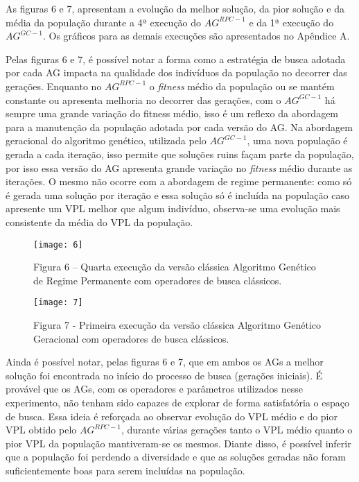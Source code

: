As figuras 6 e 7, apresentam a evolução da melhor solução, da pior solução e da média da população durante a 4ª execução do $AG^{RPC-1}$ e da 1ª execução do $AG^{GC-1}$. Os gráficos para as demais execuções são apresentados no Apêndice A.

Pelas figuras 6 e 7, é possível notar a forma como a estratégia de busca adotada por cada AG impacta na qualidade dos indivíduos da população no decorrer das gerações. Enquanto no $AG^{RPC-1}$ o \textit{fitness} médio da população ou se mantém constante ou apresenta melhoria no decorrer das gerações, com o $AG^{GC-1}$ há sempre uma grande variação do fitness médio, isso é um reflexo da abordagem para a manutenção da população adotada por cada versão do AG. Na abordagem geracional do algoritmo genético, utilizada pelo $AG^{GC-1}$, uma nova população é gerada a cada iteração, isso permite que soluções ruins façam parte da população, por isso essa versão do AG apresenta grande variação no \textit{fitness} médio durante as iterações. O mesmo não ocorre com a abordagem de regime permanente: como só é gerada uma solução por iteração e essa solução só é incluída na população caso apresente um VPL melhor que algum indivíduo, observa-se uma evolução mais consistente da média do VPL da população.

\begin{figure}[htb]

\texttt{[image: 6]}

\caption{Figura 6 – Quarta execução da versão clássica Algoritmo Genético de Regime Permanente com operadores de busca clássicos.}

\end{figure}

\begin{figure}[htb]

\texttt{[image: 7]}

\caption{Figura 7 - Primeira execução da versão clássica Algoritmo Genético Geracional com operadores de busca clássicos.}
\end{figure}

Ainda é possível notar, pelas figuras 6 e 7, que em ambos os AGs a melhor solução foi encontrada no início do processo de busca (gerações iniciais). É provável que os AGs, com os operadores e parâmetros utilizados nesse experimento, não tenham sido capazes de explorar de forma satisfatória o espaço de busca. Essa ideia é reforçada ao observar evolução do VPL médio e do pior VPL obtido pelo $AG^{RPC-1}$, durante várias gerações tanto o VPL médio quanto o pior VPL da população mantiveram-se os mesmos. Diante disso, é possível inferir que a população foi perdendo a diversidade e que as soluções geradas não foram suficientemente boas para serem incluídas na população.

